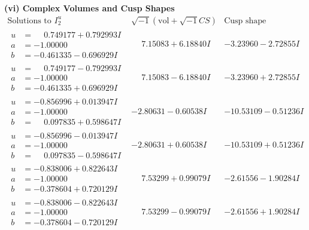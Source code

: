 \documentclass[1p]{elsarticle_modified}
\theoremstyle{definition}
\newcommand{\I}{\sqrt{-1}}
\begin{document}
\newpage\flushleft \textbf{(vi) Complex Volumes and Cusp Shapes}
$$\begin{array}{c|c|c}  
\text{Solutions to }I^u_{2}& \I (\text{vol} + \sqrt{-1}CS) & \text{Cusp shape}\\
 \hline 
\begin{aligned}
u &= \phantom{-}0.749177 + 0.792993 I \\
a &= -1.00000\phantom{ +0.000000I} \\
b &= -0.461335 - 0.696929 I\end{aligned}
 & \phantom{-}7.15083 + 6.18840 I & -3.23960 - 2.72855 I \\ \hline\begin{aligned}
u &= \phantom{-}0.749177 - 0.792993 I \\
a &= -1.00000\phantom{ +0.000000I} \\
b &= -0.461335 + 0.696929 I\end{aligned}
 & \phantom{-}7.15083 - 6.18840 I & -3.23960 + 2.72855 I \\ \hline\begin{aligned}
u &= -0.856996 + 0.013947 I \\
a &= -1.00000\phantom{ +0.000000I} \\
b &= \phantom{-}0.097835 + 0.598647 I\end{aligned}
 & -2.80631 - 0.60538 I & -10.53109 - 0.51236 I \\ \hline\begin{aligned}
u &= -0.856996 - 0.013947 I \\
a &= -1.00000\phantom{ +0.000000I} \\
b &= \phantom{-}0.097835 - 0.598647 I\end{aligned}
 & -2.80631 + 0.60538 I & -10.53109 + 0.51236 I \\ \hline\begin{aligned}
u &= -0.838006 + 0.822643 I \\
a &= -1.00000\phantom{ +0.000000I} \\
b &= -0.378604 + 0.720129 I\end{aligned}
 & \phantom{-}7.53299 + 0.99079 I & -2.61556 - 1.90284 I \\ \hline\begin{aligned}
u &= -0.838006 - 0.822643 I \\
a &= -1.00000\phantom{ +0.000000I} \\
b &= -0.378604 - 0.720129 I\end{aligned}
 & \phantom{-}7.53299 - 0.99079 I & -2.61556 + 1.90284 I \\ \hline\begin{aligned}

\end{aligned}
\end{array}$$
\end{document}
